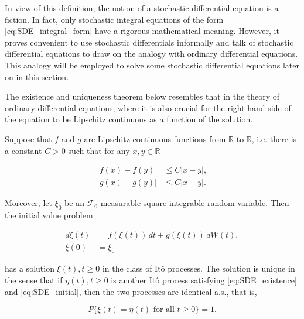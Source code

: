 \begin{Remark}
\label{rm:7.3}
In view of this definition, the notion of a stochastic differential equation is a fiction. In fact, only stochastic integral equations of the form \eqref{eq:SDE_integral_form} have a rigorous mathematical meaning. However, it proves convenient to use stochastic differentials informally and talk of stochastic differential equations to draw on the analogy with ordinary differential equations. This analogy will be employed to solve some stochastic differential equations later on in this section.
\end{Remark}

The existence and uniqueness theorem below resembles that in the theory of ordinary differential equations, where it is also crucial for the right-hand side of the equation to be Lipschitz continuous as a function of the solution.

\begin{Theorem}
\label{th:7.7}
Suppose that $f$ and $g$ are Lipschitz continuous functions from $\mathbb{R}$ to $\mathbb{R}$, i.e. there is a constant $C > 0$ such that for any $x, y \in \mathbb{R}$

\begin{align}
|f(x) - f(y)| & \leq C |x - y|, \label{eq:Lipschitz_f} \\
|g(x) - g(y)| & \leq C |x - y|. \label{eq:Lipschitz_g}
\end{align}

Moreover, let $\xi_0$ be an $\mathcal{F}_0$-measurable square integrable random variable. Then the initial value problem

\begin{align}
d\xi(t) & = f(\xi(t)) \, dt + g(\xi(t)) \, dW(t), \label{eq:SDE_existence} \\
\xi(0) & = \xi_0 \label{eq:SDE_initial}
\end{align}

has a solution $\xi(t), t \geq 0$ in the class of Itô processes. The solution is unique in the sense that if $\eta(t), t \geq 0$ is another Itô process satisfying \eqref{eq:SDE_existence} and \eqref{eq:SDE_initial}, then the two processes are identical a.s., that is,

\begin{equation}
P\{\xi(t) = \eta(t) \text{ for all } t \geq 0\} = 1.
\end{equation}
\end{Theorem}

